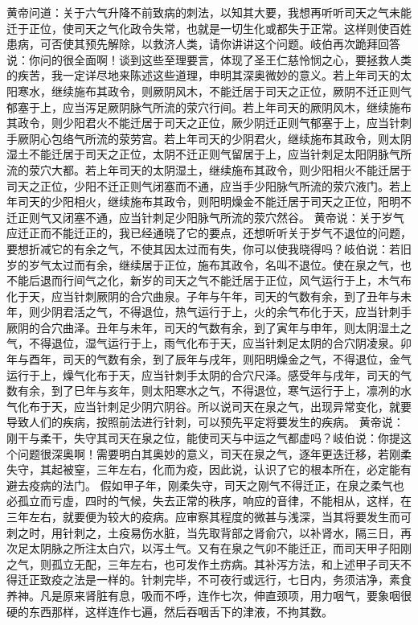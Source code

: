\documentclass[12pt,UTF8]{ctexbook}
\begin{document}
黄帝问道：关于六气升降不前致病的刺法，以知其大要，我想再听听司天之气未能迁于正位，使司天之气化政令失常，也就是一切生化或都失于正常。这样则使百姓患病，可否使其预先解除，以救济人类，请你讲讲这个问题。岐伯再次跪拜回答说：你问的很全面啊！谈到这些至理要言，体现了圣王仁慈怜悯之心，要拯救人类的疾苦，我一定详尽地来陈述这些道理，申明其深奥微妙的意义。若上年司天的太阳寒水，继续施布其政令，则厥阴风木，不能迁居于司天之正位，厥阴不迁正则气郁塞于上，应当泻足厥阴脉气所流的荥穴行间。若上年司天的厥阴风木，继续施布其政令，则少阳君火不能迁居于司天之正位，厥少阴迁正则气郁塞于上，应当针刺手厥阴心包络气所流的荥劳宫。若上年司天的少阴君火，继续施布其政令，则太阴湿土不能迁居于司天之正位，太阴不迁正则气留居于上，应当针刺足太阳阴脉气所流的荥穴大都。若上年司天的太阴湿土，继续施布其政令，则少阳相火不能迁居于司天之正位，少阳不迁正则气闭塞而不通，应当手少阳脉气所流的荥穴液门。若上年司天的少阳相火，继续施布其政令，则阳明燥金不能迁居于司天之正位，阳明不迁正则气又闭塞不通，应当针刺足少阳脉气所流的荥穴然谷。
黄帝说：关于岁气应迁正而不能迁正的，我已经通晓了它的要点，还想听听关于岁气不退位的问题，要想折减它的有余之气，不使其因太过而有失，你可以使我晓得吗？岐伯说：若旧岁的岁气太过而有余，继续居于正位，施布其政令，名叫不退位。使在泉之气，也不能后退而行间气之化，新岁的司天之气不能迁居于正位，风气运行于上，木气布化于天，应当针刺厥阴的合穴曲泉。子年与午年，司天的气数有余，到了丑年与未年，则少阴君活之气，不得退位，热气运行于上，火的余气布化于天，应当针刺手厥阴的合穴曲泽。丑年与未年，司天的气数有余，到了寅年与申年，则太阴湿土之气，不得退位，湿气运行于上，雨气化布于天，应当针刺足太阴的合穴阴凌泉。卯年与酉年，司天的气数有余，到了辰年与戌年，则阳明燥金之气，不得退位，金气运行于上，燥气化布于天，应当针刺手太阴的合穴尺泽。感受年与戌年，司天的气数有余，到了巳年与亥年，则太阳寒水之气，不得退位，寒气运行于上，凛冽的水气化布于天，应当针刺足少阴穴阴谷。所以说司天在泉之气，出现异常变化，就要导致人们的疾病，按照前法进行针刺，可以预先平定将要发生的疾病。
黄帝说：刚干与柔干，失守其司天在泉之位，能使司天与中运之气都虚吗？岐伯说：你提这个问题很深奥啊！需要明白其奥妙的意义，司天在泉之气，逐年更迭迁移，若刚柔失守，其起被窒，三年左右，化而为疫，因此说，认识了它的根本所在，必定能有避去疫病的法门。
假如甲子年，刚柔失守，司天之刚气不得迁正，在泉之柔气也必孤立而亏虚，四时的气候，失去正常的秩序，响应的音律，不能相从，这样，在三年左右，就要便为较大的疫病。应审察其程度的微甚与浅深，当其将要发生而可刺之时，用针刺之，土疫易伤水脏，当先取背部之肾俞穴，以补肾水，隔三日，再次足太阴脉之所注太白穴，以泻土气。又有在泉之气卯不能迁正，而司天甲子阳刚之气，则孤立无配，三年左右，也可发作土疠病。其补泻方法，和上述甲子司天不得迁正致疫之法是一样的。针刺完毕，不可夜行或远行，七日内，务须洁净，素食养神。凡是原来肾脏有息，吸而不呼，连作七次，伸直颈项，用力咽气，要象咽很硬的东西那样，这样连作七遍，然后吞咽舌下的津液，不拘其数。
\end{document}
